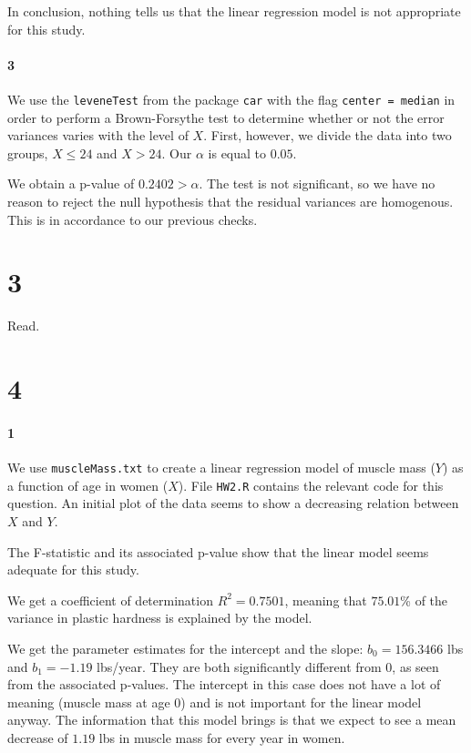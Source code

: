 \documentclass[]{article}
\let\oldparagraph\paragraph
\renewcommand{\paragraph}[1]{\oldparagraph{#1}\mbox{}}
\begin{document}
In conclusion, nothing tells us that the linear regression model is not appropriate for this study.

\paragraph{3}
We use the \texttt{leveneTest} from the package \texttt{car} with the flag \texttt{center = median} in order to perform a Brown-Forsythe test to determine whether or not the error variances varies with the level of $X$. First, however, we divide the data into two groups, $X \leq 24$ and $X>24$. Our $\alpha$ is equal to $0.05$.

We obtain a p-value of $0.2402 > \alpha$. The test is not significant, so we have no reason to reject the null hypothesis that the residual variances are homogenous. This is in accordance to our previous checks.

\section*{3}
Read.


\section*{4}
\paragraph{1}
We use \texttt{muscleMass.txt} to create a linear regression model of muscle mass ($Y$) as a function of age in women ($X$). File \texttt{HW2.R} contains the relevant code for this question. An initial plot of the data seems to show a decreasing relation between $X$ and $Y$.

The F-statistic and its associated p-value show that the linear model seems adequate for this study.

We get a coefficient of determination $R^2 = 0.7501$, meaning that $75.01$\% of the variance in plastic hardness is explained by the model. 

We get the parameter estimates for the intercept and the slope: $b_0 = 156.3466$ lbs and $b_1 = -1.19$ lbs/year. They are both significantly different from $0$, as seen from the associated p-values. The intercept in this case does not have a lot of meaning (muscle mass at age 0) and is not important for the linear model anyway. The information that this model brings is that we expect to see a mean decrease of $1.19$ lbs in muscle mass for every year in women.
\end{document}
